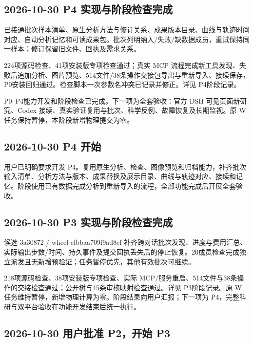 \documentclass[11pt,a4paper]{ctexart}
\begin{document}
\subsection{2026-10-30 P4 实现与阶段检查完成}


已接通批次样本清单、原生分析方法与修订关系、成果版本目录、曲线与轨迹时间对应、自动分析记忆和可读成果包。批次列明纳入/\allowbreak{}失败/\allowbreak{}缺数据成员，重试保持同一样本；修订保留旧文件、回执及需求关系。



224项源码检查、41项安装版专项检查通过；真实 MCP 流程完成新工具发现、失败后追加分析、图片预览、514文件/\allowbreak{}38条操作交接包导出与重新导入、接续保存，P0安装回归通过。检查脚本一次参数名冲突已记录并修正。详见 P4阶段记录。



P0–P4能力开发和阶段检查已完成。下一项为全套验收：官方 DSH 可见页面新研究、Codex 接续、真实验证复用与批次、科学反例、故障恢复及长期监视。原 W 任务保持暂停，本阶段新增物理提交为零。



\subsection{2026-10-30 P4 开始}


用户已明确要求开发 P4。复用原生分析、检查、图像预览和归档能力，补齐批次输入清单、分析方法与版本、成果替换及展示目录、曲线与轨迹对应、接续和记忆。阶段使用已有数据完成分析到重新导入的流程，全部功能完成后开展全套验收。



\subsection{2026-10-30 P3 实现与阶段检查完成}


候选 3a30872 /\allowbreak{} wheel cfbbaa709f9ad8ef 补齐跨对话批次发现、进度与费用汇总、实际输出步数/\allowbreak{}时间、持久事件及提交回执丢失后的停止恢复。20成员检查完成独立派发且无新增预验证；任务暂停优先，其他有效批次可继续。



218项源码检查、38项安装版专项检查、实际 MCP/\allowbreak{}服务重启、514文件与38条操作的交接检查通过；公开树与45条审核映射检查通过。详见 P3阶段记录。原 W 任务维持暂停，新增物理计算为零。阶段结果向用户汇报；下一项为 P4，完整科研与双平台验收在功能开发结束后统一执行。



\subsection{2026-10-30 用户批准 P2，开始 P3}
\end{document}
